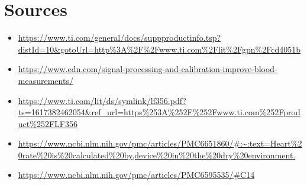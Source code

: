 \documentclass{article}
\begin{document}
\section{Sources}
\begin{itemize}
    \item \url{https://www.ti.com/general/docs/suppproductinfo.tsp?distId=10&gotoUrl=http%3A%2F%2Fwww.ti.com%2Flit%2Fgpn%2Fcd4051b}
    \item \url{https://www.edn.com/signal-processing-and-calibration-improve-blood-measurements/}
    \item \url{https://www.ti.com/lit/ds/symlink/lf356.pdf?ts=1617382462054&ref_url=https%253A%252F%252Fwww.ti.com%252Fproduct%252FLF356}
    \item \url{https://www.ncbi.nlm.nih.gov/pmc/articles/PMC6651860/#:~:text=Heart%20rate%20is%20calculated%20by,device%20in%20the%20dry%20environment.}
    \item \url{https://www.ncbi.nlm.nih.gov/pmc/articles/PMC6595535/#C14}
\end{itemize}
\end{document}
